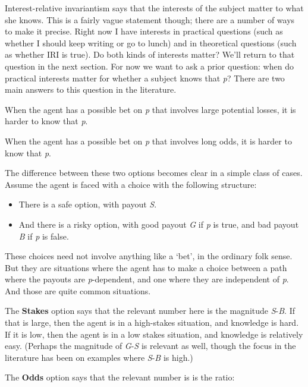 \documentclass[
  11pt,
  letterpaper,
  DIV=11,
  numbers=noendperiod,
  twoside]{scrartcl}
\providecommand{\tightlist}{%
  \setlength{\itemsep}{0pt}\setlength{\parskip}{0pt}}
\begin{document}
Interest-relative invariantism says that the interests of the subject
matter to what she knows. This is a fairly vague statement though; there
are a number of ways to make it precise. Right now I have interests in
practical questions (such as whether I should keep writing or go to
lunch) and in theoretical questions (such as whether IRI is true). Do
both kinds of interests matter? We'll return to that question in the
next section. For now we want to ask a prior question: when do practical
interests matter for whether a subject knows that \emph{p}? There are
two main answers to this question in the literature.

\begin{description}
\tightlist
\item[Stakes]
When the agent has a possible bet on \emph{p} that involves large
potential losses, it is harder to know that \emph{p}.
\item[Odds]
When the agent has a possible bet on \emph{p} that involves long odds,
it is harder to know that \emph{p}.
\end{description}

The difference between these two options becomes clear in a simple class
of cases. Assume the agent is faced with a choice with the following
structure:

\begin{itemize}
\tightlist
\item
  There is a safe option, with payout \emph{S}.
\item
  And there is a risky option, with good payout \emph{G} if \emph{p} is
  true, and bad payout \emph{B} if \emph{p} is false.
\end{itemize}

These choices need not involve anything like a `bet', in the ordinary
folk sense. But they are situations where the agent has to make a choice
between a path where the payouts are \emph{p}-dependent, and one where
they are independent of \emph{p}. And those are quite common situations.

The \textbf{Stakes} option says that the relevant number here is the
magnitude \emph{S}-\emph{B}. If that is large, then the agent is in a
high-stakes situation, and knowledge is hard. If it is low, then the
agent is in a low stakes situation, and knowledge is relatively easy.
(Perhaps the magnitude of \emph{G}-\emph{S} is relevant as well, though
the focus in the literature has been on examples where \emph{S}-\emph{B}
is high.)

The \textbf{Odds} option says that the relevant number is is the ratio:
\end{document}
